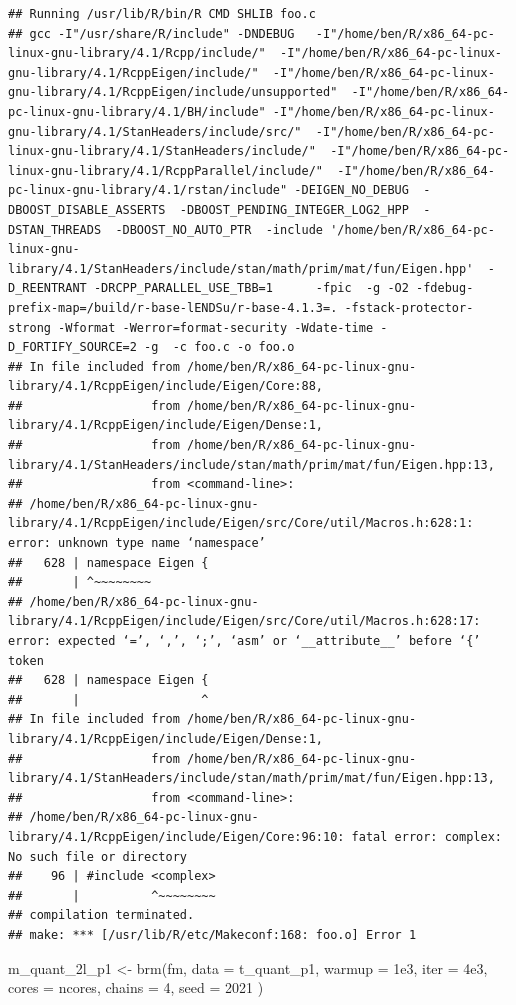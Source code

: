 \documentclass[
]{article}
\newenvironment{Shaded}{\begin{snugshade}}{\end{snugshade}}
\newcommand{\AttributeTok}[1]{\textcolor[rgb]{0.77,0.63,0.00}{#1}}
\newcommand{\DecValTok}[1]{\textcolor[rgb]{0.00,0.00,0.81}{#1}}
\newcommand{\FloatTok}[1]{\textcolor[rgb]{0.00,0.00,0.81}{#1}}
\newcommand{\FunctionTok}[1]{\textcolor[rgb]{0.00,0.00,0.00}{#1}}
\newcommand{\NormalTok}[1]{#1}
\newcommand{\OtherTok}[1]{\textcolor[rgb]{0.56,0.35,0.01}{#1}}
\begin{document}
\begin{verbatim}
## Running /usr/lib/R/bin/R CMD SHLIB foo.c
## gcc -I"/usr/share/R/include" -DNDEBUG   -I"/home/ben/R/x86_64-pc-linux-gnu-library/4.1/Rcpp/include/"  -I"/home/ben/R/x86_64-pc-linux-gnu-library/4.1/RcppEigen/include/"  -I"/home/ben/R/x86_64-pc-linux-gnu-library/4.1/RcppEigen/include/unsupported"  -I"/home/ben/R/x86_64-pc-linux-gnu-library/4.1/BH/include" -I"/home/ben/R/x86_64-pc-linux-gnu-library/4.1/StanHeaders/include/src/"  -I"/home/ben/R/x86_64-pc-linux-gnu-library/4.1/StanHeaders/include/"  -I"/home/ben/R/x86_64-pc-linux-gnu-library/4.1/RcppParallel/include/"  -I"/home/ben/R/x86_64-pc-linux-gnu-library/4.1/rstan/include" -DEIGEN_NO_DEBUG  -DBOOST_DISABLE_ASSERTS  -DBOOST_PENDING_INTEGER_LOG2_HPP  -DSTAN_THREADS  -DBOOST_NO_AUTO_PTR  -include '/home/ben/R/x86_64-pc-linux-gnu-library/4.1/StanHeaders/include/stan/math/prim/mat/fun/Eigen.hpp'  -D_REENTRANT -DRCPP_PARALLEL_USE_TBB=1      -fpic  -g -O2 -fdebug-prefix-map=/build/r-base-lENDSu/r-base-4.1.3=. -fstack-protector-strong -Wformat -Werror=format-security -Wdate-time -D_FORTIFY_SOURCE=2 -g  -c foo.c -o foo.o
## In file included from /home/ben/R/x86_64-pc-linux-gnu-library/4.1/RcppEigen/include/Eigen/Core:88,
##                  from /home/ben/R/x86_64-pc-linux-gnu-library/4.1/RcppEigen/include/Eigen/Dense:1,
##                  from /home/ben/R/x86_64-pc-linux-gnu-library/4.1/StanHeaders/include/stan/math/prim/mat/fun/Eigen.hpp:13,
##                  from <command-line>:
## /home/ben/R/x86_64-pc-linux-gnu-library/4.1/RcppEigen/include/Eigen/src/Core/util/Macros.h:628:1: error: unknown type name ‘namespace’
##   628 | namespace Eigen {
##       | ^~~~~~~~~
## /home/ben/R/x86_64-pc-linux-gnu-library/4.1/RcppEigen/include/Eigen/src/Core/util/Macros.h:628:17: error: expected ‘=’, ‘,’, ‘;’, ‘asm’ or ‘__attribute__’ before ‘{’ token
##   628 | namespace Eigen {
##       |                 ^
## In file included from /home/ben/R/x86_64-pc-linux-gnu-library/4.1/RcppEigen/include/Eigen/Dense:1,
##                  from /home/ben/R/x86_64-pc-linux-gnu-library/4.1/StanHeaders/include/stan/math/prim/mat/fun/Eigen.hpp:13,
##                  from <command-line>:
## /home/ben/R/x86_64-pc-linux-gnu-library/4.1/RcppEigen/include/Eigen/Core:96:10: fatal error: complex: No such file or directory
##    96 | #include <complex>
##       |          ^~~~~~~~~
## compilation terminated.
## make: *** [/usr/lib/R/etc/Makeconf:168: foo.o] Error 1
\end{verbatim}

\begin{Shaded}
\begin{Highlighting}[]
\NormalTok{m\_quant\_2l\_p1 }\OtherTok{\textless{}{-}} \FunctionTok{brm}\NormalTok{(fm, }\AttributeTok{data =}\NormalTok{ t\_quant\_p1, }
                     \AttributeTok{warmup =} \FloatTok{1e3}\NormalTok{, }\AttributeTok{iter =} \FloatTok{4e3}\NormalTok{, }\AttributeTok{cores =}\NormalTok{ ncores, }\AttributeTok{chains =} \DecValTok{4}\NormalTok{, }
                     \AttributeTok{seed =} \DecValTok{2021}
\NormalTok{                     )}
\end{Highlighting}
\end{Shaded}
\end{document}
